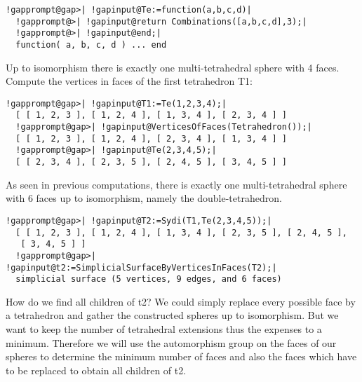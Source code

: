 \documentclass[a4paper,11pt]{report}
\begin{document}
{{{ 
\begin{Verbatim}[commandchars=!@|,fontsize=\small,frame=single,label=Example]
  !gapprompt@gap>| !gapinput@Te:=function(a,b,c,d)|
  !gapprompt@>| !gapinput@return Combinations([a,b,c,d],3);|
  !gapprompt@>| !gapinput@end;|
  function( a, b, c, d ) ... end
\end{Verbatim}
 

 Up to isomorphism there is exactly one multi-tetrahedral sphere with 4 faces.
Compute the vertices in faces of the first tetrahedron T1: 

 
\begin{center}

\end{center}
 
\begin{Verbatim}[commandchars=!@|,fontsize=\small,frame=single,label=Example]
  !gapprompt@gap>| !gapinput@T1:=Te(1,2,3,4);|
  [ [ 1, 2, 3 ], [ 1, 2, 4 ], [ 1, 3, 4 ], [ 2, 3, 4 ] ]
  !gapprompt@gap>| !gapinput@VerticesOfFaces(Tetrahedron());|
  [ [ 1, 2, 3 ], [ 1, 2, 4 ], [ 2, 3, 4 ], [ 1, 3, 4 ] ]
  !gapprompt@gap>| !gapinput@Te(2,3,4,5);|
  [ [ 2, 3, 4 ], [ 2, 3, 5 ], [ 2, 4, 5 ], [ 3, 4, 5 ] ]
\end{Verbatim}
 

 As seen in previous computations, there is exactly one multi-tetrahedral
sphere with 6 faces up to isomorphism, namely the double-tetrahedron. 

 
\begin{Verbatim}[commandchars=!@|,fontsize=\small,frame=single,label=Example]
  !gapprompt@gap>| !gapinput@T2:=Sydi(T1,Te(2,3,4,5));|
  [ [ 1, 2, 3 ], [ 1, 2, 4 ], [ 1, 3, 4 ], [ 2, 3, 5 ], [ 2, 4, 5 ], 
   [ 3, 4, 5 ] ]
  !gapprompt@gap>| !gapinput@t2:=SimplicialSurfaceByVerticesInFaces(T2);|
  simplicial surface (5 vertices, 9 edges, and 6 faces)
\end{Verbatim}
 

 
\begin{center}

\end{center}
 

 How do we find all children of t2? We could simply replace every possible face
by a tetrahedron and gather the constructed spheres up to isomorphism. But we
want to keep the number of tetrahedral extensions thus the expenses to a
minimum. Therefore we will use the automorphism group on the faces of our
spheres to determine the minimum number of faces and also the faces which have
to be replaced to obtain all children of t2. 

}}}
\end{document}

